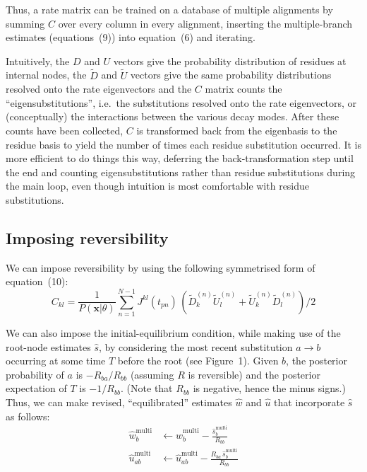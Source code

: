 \documentclass[12pt]{article}
\begin{document}
Thus, a rate matrix can be trained on a database of multiple alignments by summing $C$ over every
column in every alignment, inserting the multiple-branch estimates (equations~(9)) into equation~(6)
and iterating.

Intuitively, the $D$ and $U$ vectors give the probability distribution of residues at internal
nodes, the $\tilde{D}$ and $\tilde{U}$ vectors give the same probability distributions resolved
onto the rate eigenvectors and the $C$ matrix counts the ``eigensubstitutions'', i.e.\ the
substitutions resolved onto the rate eigenvectors, or (conceptually) the interactions between the
various decay modes. After these counts have been collected, $C$ is transformed back from the
eigenbasis to the residue basis to yield the number of times each residue substitution occurred. It
is more efficient to do things this way, deferring the back-transformation step until the end and
counting eigensubstitutions rather than residue substitutions during the main loop, even though
intuition is most comfortable with residue substitutions.


\subsection{Imposing reversibility}

We can impose reversibility by using the following symmetrised form of equation~(10):
\[
C_{kl} = \frac{1}{P(\mathbf{x} | \theta)} \sum_{n=1}^{N-1} J^{kl}(t_{pn})\, \left(\tilde{D}^{(n)}_k \tilde{U}^{(n)}_l + \tilde{U}^{(n)}_k \tilde{D}^{(n)}_l\right) / 2
\]

We can also impose the initial-equilibrium condition, while making use of the root-node estimates
$\hat{s}$, by considering the most recent substitution $a \to b$ occurring at some time $T$ before
the root (see Figure~1). Given $b$, the posterior probability of $a$ is $-R_{ba}/R_{bb}$ (assuming
$R$ is reversible) and the posterior expectation of $T$ is $-1/R_{bb}$. (Note that $R_{bb}$ is
negative, hence the minus signs.) Thus, we can make revised, ``equilibrated'' estimates $\hat{w}$
and $\hat{u}$ that incorporate $\hat{s}$ as follows:
\begin{align*}
\hat{w}^{\text{multi}}_b &\leftarrow \hat{w}^{\text{multi}}_b - \frac{\hat{s}^{\text{multi}}_b}{R_{bb}} \\[4pt]
\hat{u}^{\text{multi}}_{ab} &\leftarrow \hat{u}^{\text{multi}}_{ab} - \frac{R_{ba}\, \hat{s}^{\text{multi}}_b}{R_{bb}}
\end{align*}
\end{document}
